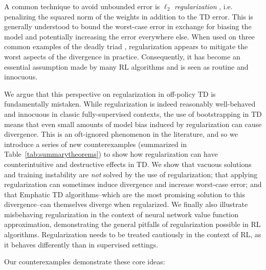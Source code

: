 A common technique to avoid unbounded error is $\ell_2$ \emph{regularization} \cite{tikhonov1943stability}, i.e. penalizing the squared norm of the weights in addition to the TD error.  This is generally understood to bound the worst-case error in exchange for biasing the model and potentially increasing the error everywhere else.  When used on three common examples of the deadly triad \cite[pg.260]{kolter2011fixed,baird1993counterexample,sutton2020reinforcement}, regularization appears to mitigate the worst aspects of the divergence in practice.  Consequently, it has become an essential assumption made by many RL algorithms \cite{diddigi2019convergent,mahadevan2014proximal,sutton2009fast,yu2017convergence,zhang2020provably,zhang2021breaking,kumar2022dr} and is seen as routine and innocuous. 

We argue that this perspective on regularization in off-policy TD is fundamentally mistaken.  While regularization is indeed reasonably well-behaved and innocuous in classic fully-supervised contexts, the use of bootstrapping in TD means that even small amounts of model bias induced by regularization can cause divergence.  This is an oft-ignored phenomenon in the literature, and so we introduce a series of new counterexamples (summarized in Table~\ref{tab:summarytheorems}) to show how regularization can have counterintuitive and destructive effects in TD. We show that vacuous solutions and training instability are \emph{not} solved by the use of regularization; that applying regularization can sometimes induce divergence and increase worst-case error; and that Emphatic TD algorithms--which are the most promising solution to this divergence--can themselves diverge when regularized. We finally also illustrate misbehaving regularization in the context of neural network value function approximation, demonstrating the general pitfalls of regularization possible in RL algorithms.  Regularization needs to be treated cautiously in the context of RL, as it behaves differently than in supervised settings.

Our counterexamples demonstrate these core ideas:


